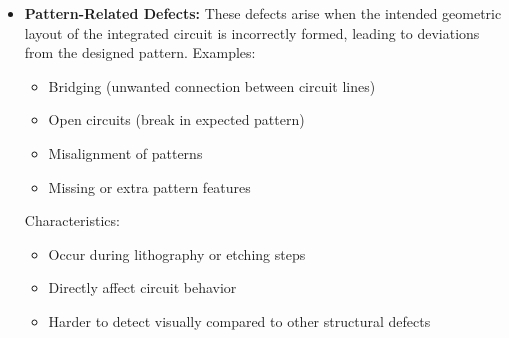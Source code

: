 \begin{itemize}
        \item \textbf{Pattern-Related Defects:}
        These defects arise when the intended geometric layout of the integrated circuit is incorrectly formed, leading to deviations from the designed pattern.
        Examples:
    \begin{itemize}
        \item Bridging (unwanted connection between circuit lines)
        \item Open circuits (break in expected pattern)
        \item Misalignment of patterns
        \item Missing or extra pattern features
    \end{itemize}
    Characteristics:
        \begin{itemize}
            \item Occur during lithography or etching steps
            \item Directly affect circuit behavior
            \item Harder to detect visually compared to other structural defects
        \end{itemize}
\end{itemize}

